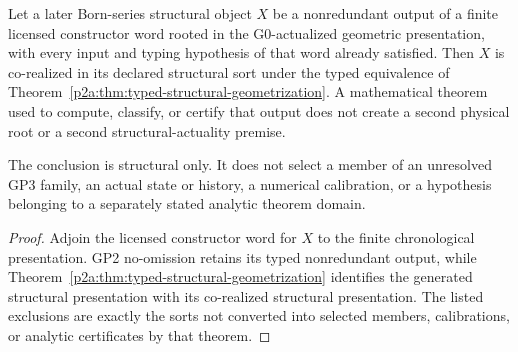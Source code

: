 \documentclass[12pt,a4paper]{article}
\begin{document}
\begin{corollary}
\label{p2a:cor:born-series-rooted-structural-descendant}
Let a later Born-series structural object \(X\) be a nonredundant output of a
finite licensed constructor word rooted in the G0-actualized geometric
presentation, with every input and typing hypothesis of that word already
satisfied.  Then \(X\) is co-realized in its declared structural sort under
the typed equivalence of
Theorem~\ref{p2a:thm:typed-structural-geometrization}.  A mathematical theorem
used to compute, classify, or certify that output does not create a second
physical root or a second structural-actuality premise.

The conclusion is structural only.  It does not select a member of an
unresolved GP3 family, an actual state or history, a numerical calibration,
or a hypothesis belonging to a separately stated analytic theorem domain.
\end{corollary}
\begin{proof}
Adjoin the licensed constructor word for \(X\) to the finite chronological
presentation.  GP2 no-omission retains its typed nonredundant output, while
Theorem~\ref{p2a:thm:typed-structural-geometrization} identifies the generated
structural presentation with its co-realized structural presentation.  The
listed exclusions are exactly the sorts not converted into selected members,
calibrations, or analytic certificates by that theorem.
\end{proof}
\end{document}
